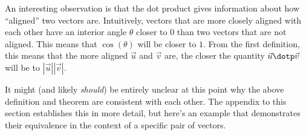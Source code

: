 \documentclass{ximera}
\begin{document}
\begin{remark}
An interesting observation is that the dot product gives information about how ``aligned'' two vectors are.  Intuitively, vectors that are more closely aligned with each other have an interior angle $\theta$ closer to $0$ than two vectors that are not aligned.  This means that $\cos(\theta)$ will be closer to $1$. From the first definition, this means that the more aligned $\vec{u}$ and $\vec{v}$ are, the closer the quantity $\vec{u} \dotp \vec{v}$ will be to $|\vec{u}||\vec{v}|$.
\end{remark}


It might (and likely \emph{should}) be entirely unclear at this point why the above definition and theorem are consistent with each other.  The appendix to this section establishes this in more detail, but here's an example that demonstrates their equivalence in the context of a specific pair of vectors.
\end{document}

